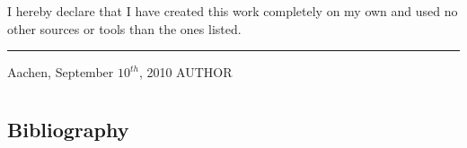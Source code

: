 \documentclass[final,twoside,11pt,titlepage,a4paper,english,bibliography=totocnumbered,listof=numbered]{scrbook}
\newcommand{\auth}{AUTHOR}
\begin{document}
I hereby declare that I have created this work completely on my own and used no other sources or tools than the ones listed.

\vspace{30 mm}

\begin{flushright}
	\rule{90mm}{1pt}

	Aachen, September $10^{th}$, 2010 \hspace{24 mm} \auth
\end{flushright}

\newpage


\cleardoublepage{}


\tableofcontents{}

\mainmatter

\part{}



\part{}


\part{}




\setwidesite{}

\begin{appendix} 

\addappheadtotoc

\chapter{Bibliography}
\label{cha:bibliography}
\printbibliography[heading=offline,filter=offline]
\printbibliography[heading=online,filter=online]






%

% 


\end{appendix}

\backmatter
\end{document}
